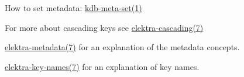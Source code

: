 \begin{DoxyItemize}
\item How to set metadata\+: \hyperlink{doc_help_kdb-meta-set_md}{kdb-\/meta-\/set(1)}
\item For more about cascading keys see \hyperlink{doc_help_elektra-cascading_md}{elektra-\/cascading(7)}
\item \hyperlink{doc_help_elektra-metadata_md}{elektra-\/metadata(7)} for an explanation of the metadata concepts.
\item \hyperlink{doc_help_elektra-key-names_md}{elektra-\/key-\/names(7)} for an explanation of key names. 
\end{DoxyItemize}